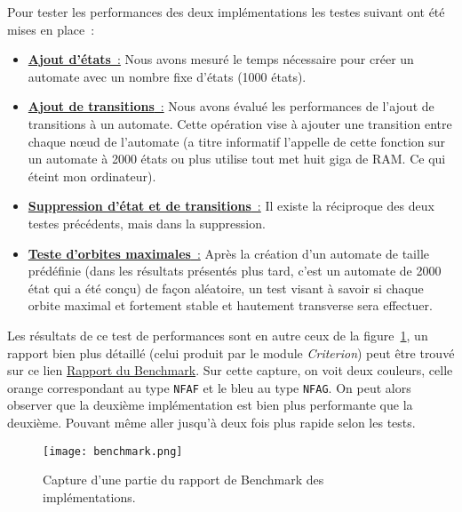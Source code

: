 \vphantom{}

Pour tester les performances des deux implémentations les testes suivant ont été
mises en place~:

\begin{itemize}
    \item[\textbullet] \underline{\textbf{Ajout d'états}~:} Nous avons mesuré le
        temps nécessaire pour créer un automate avec un nombre fixe d'états
        (1000 états).
    \item[\textbullet] \underline{\textbf{Ajout de transitions}~:} Nous avons
        évalué les performances de l'ajout de transitions à un automate.
        Cette opération vise à ajouter une transition entre chaque n\oe ud de
        l'automate (a titre informatif l'appelle de cette fonction sur un automate à
        2000 états ou plus utilise tout met huit giga de RAM. Ce qui éteint mon
        ordinateur).
    \item[\textbullet] \underline{\textbf{Suppression d'état et de transitions}~:}
        Il existe la réciproque des deux testes précédents, mais dans la suppression.
    \item[\textbullet] \underline{\textbf{Teste d'orbites maximales}~:} Après la
        création d'un automate de taille prédéfinie (dans les résultats présentés plus
        tard, c'est un automate de 2000 état qui a été conçu) de façon aléatoire, un
        test visant à savoir si chaque orbite maximal et fortement stable et hautement
        transverse sera effectuer.
\end{itemize}

\vphantom{}

Les résultats de ce test de performances sont en autre ceux de la
figure~\ref{fig:imgBench}, un rapport bien plus détaillé (celui produit par le
module \textit{Criterion}) peut être trouvé sur ce lien
\href{run:./report_perf.html}{Rapport du Benchmark}. Sur cette capture, on voit
deux couleurs, celle orange correspondant au type \texttt{NFAF} et
le bleu au type \texttt{NFAG}. On peut alors observer que la
deuxième implémentation est bien plus performante que la deuxième. Pouvant même
aller jusqu'à deux fois plus rapide selon les tests.

\begin{figure}[H]
    \texttt{[image: benchmark.png]}
    \caption{
        Capture d'une partie du rapport de Benchmark des implémentations.
    }\label{fig:imgBench}
\end{figure}

